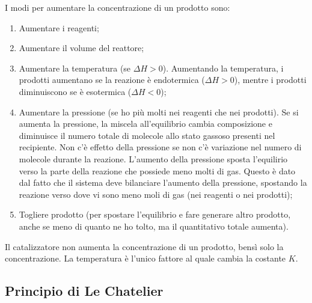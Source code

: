\documentclass[a4paper]{article}
\begin{document}
I modi per aumentare la concentrazione di un prodotto sono:
\begin{enumerate}
    \item Aumentare i reagenti;
    \item Aumentare il volume del reattore;
    \item Aumentare la temperatura (se \(\Delta H > 0\)).
        Aumentando la temperatura,
        i prodotti aumentano se la reazione è endotermica (\(\Delta H > 0\)),
        mentre i prodotti diminuiscono se è esotermica (\(\Delta H < 0\));
    \item Aumentare la pressione (se ho più molti nei reagenti che nei prodotti).
        Se si aumenta la pressione, la miscela all'equilibrio
        cambia composizione e diminuisce il numero totale di molecole allo stato gassoso presenti nel recipiente.
        Non c'è effetto della pressione
        se non c'è variazione nel numero di molecole durante la reazione.
        L'aumento della pressione sposta l'equilirio verso la parte della reazione che possiede meno molti di gas.
        Questo è dato dal fatto che il sistema deve bilanciare l'aumento della pressione, spostando
        la reazione verso dove vi sono meno moli di gas (nei reagenti o nei prodotti);
    \item Togliere prodotto (per spostare l'equilibrio e fare generare altro prodotto, anche se meno di quanto ne ho tolto,
        ma il quantitativo totale aumenta).
\end{enumerate}

Il catalizzatore non aumenta la concentrazione di un prodotto, bensì solo la concentrazione.
La temperatura è l'unico fattore al quale cambia la costante \(K\).

\pagebreak

\subsection{Principio di Le Chatelier}

\end{document}
